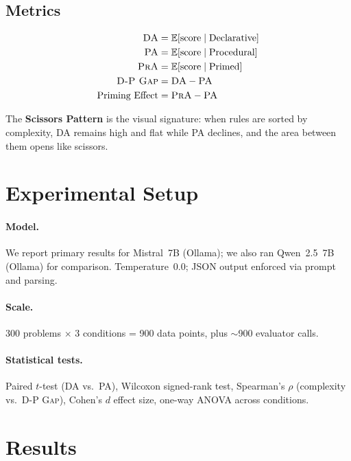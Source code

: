 \documentclass[11pt]{article}
\newcommand{\dpgap}{\textsc{D-P Gap}}
\newcommand{\da}{\textsc{DA}}
\newcommand{\pa}{\textsc{PA}}
\newcommand{\pra}{\textsc{PrA}}
\begin{document}
\subsection{Metrics}

\begin{align}
\da &= \mathbb{E}[\text{score} \mid \text{Declarative}] \\
\pa &= \mathbb{E}[\text{score} \mid \text{Procedural}] \\
\pra &= \mathbb{E}[\text{score} \mid \text{Primed}] \\
\dpgap &= \da - \pa \\
\text{Priming Effect} &= \pra - \pa
\end{align}

The \textbf{Scissors Pattern} is the visual signature: when rules are
sorted by complexity, \da{} remains high and flat while \pa{} declines,
and the area between them opens like scissors.

\section{Experimental Setup}
\label{sec:setup}

\paragraph{Model.}
We report primary results for Mistral~7B (Ollama); we also ran
Qwen~2.5~7B (Ollama) for comparison.
Temperature~0.0; JSON output enforced via prompt and parsing.

\paragraph{Scale.}
300 problems $\times$ 3 conditions = 900 data points,
plus ${\sim}$900 evaluator calls.

\paragraph{Statistical tests.}
Paired $t$-test (\da{} vs.\ \pa{}), Wilcoxon signed-rank test,
Spearman's $\rho$ (complexity vs.\ \dpgap{}),
Cohen's $d$ effect size, one-way ANOVA across conditions.

\section{Results}
\label{sec:results}
\end{document}
